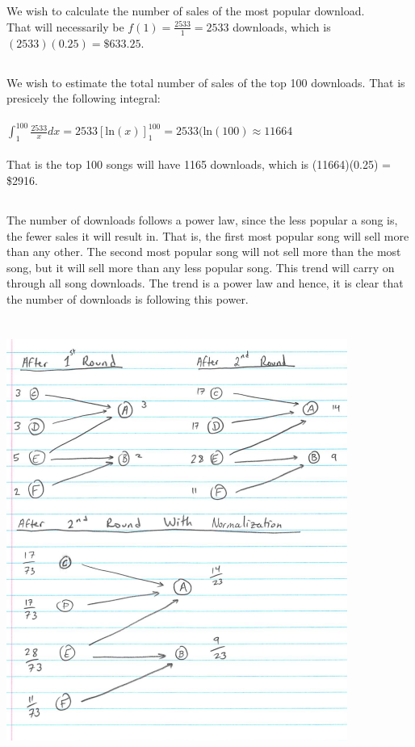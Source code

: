\documentclass[12pt]{article}
\begin{document}
\subsection{}
We wish to calculate the number of sales of the most popular download. \\ That will necessarily be $f(1) = \frac{2533}{1} = 2533$ downloads, which is $(2533)(0.25) = \$633.25$.
\subsection{}
We wish to estimate the total number of sales of the top 100 downloads. That is presicely the following integral:
\\ \\
$\int_{1}^{100} \frac{2533}{x} dx = 2533[\text{ln}(x)]^{100}_1 = 2533(\text{ln}(100) \approx 11664$
\\ \\ 
That is the top 100 songs will have 1165 downloads, which is (11664)(0.25) = \$2916.
\subsection{}
The number of downloads follows a power law, since the less popular a song is, the fewer sales it will result in. That is, the first most popular song will sell more than any other. The second most popular song will not sell more than the most song, but it will sell more than any less popular song. This trend will carry on through all song downloads. The trend is a power law and hence, it is clear that the number of downloads is following this power. 
\newpage
\section{}
\subsection{}
\includegraphics{A2Q4a.PNG}
\end{document}
